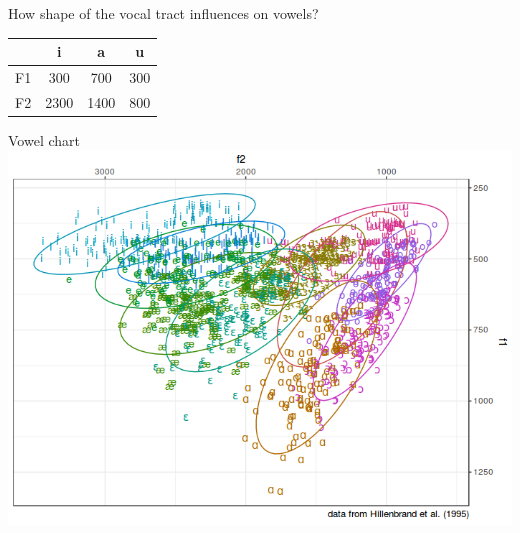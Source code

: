 \begin{frame}{How shape of the vocal tract influences on vowels?}
\Large
\vfill
\begin{center}
\begin{vowel}
\end{vowel}
\end{center}
\vfill
\normalsize
\begin{center}
\begin{tabular}{|c|c|c|c|}
\hline
 & i & a & u \\ \hline
F1 & 300 & 700 & 300 \\ \hline
F2 & 2300 & 1400 & 800 \\ \hline
\end{tabular}
\end{center}
\end{frame}

\begin{frame}{Vowel chart}
\includegraphics[width=\linewidth]{03-vowel-chart.png}
\end{frame}

